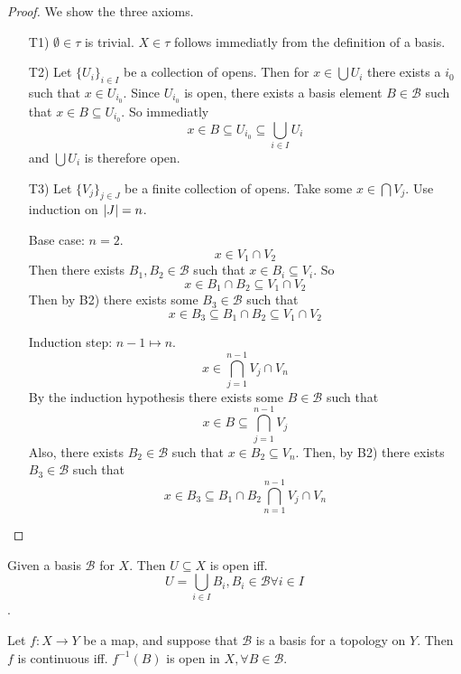 \begin{proof}
  We show the three axioms.
  \begin{enumerate}
    \item[T1)] \( \emptyset \in \tau \) is trivial. \( X \in \tau \) follows immediatly from the definition of a basis.
    \item[T2)] Let \( \{  U_i  \}_{i \in I}  \) be a collection of opens.
      Then for \( x \in \bigcup U_i \) there exists a \( i_0 \) such that
      \( x \in U_{i_0} \). Since \( U_{i_0} \) is open, there exists
      a basis element \( B \in \mathscr{B} \) such that
      \( x \in B \subseteq U_{i_0} \). So immediatly
      \[
        x \in B \subseteq U_{i_0} \subseteq \bigcup_{i \in I} U_i
      \]
      and  \( \bigcup U_i \) is therefore open.
    \item[T3)]
      Let \( \{ V_j  \}_{j \in J}  \) be a finite collection of opens.
      Take some \( x \in \bigcap V_j \). Use induction on \( \left\lvert{J}\right\rvert = n \).

      Base case: \( n = 2 \).
      \[
        x \in V_1 \cap V_2
      \]
      Then there exists \( B_1, B_2 \in \mathscr{B} \) such that
      \( x \in B_i \subseteq V_i \). So 
      \[
        x \in B_1 \cap B_2 \subseteq V_1 \cap V_2
      \]
      Then by B2) there exists some \( B_3 \in \mathscr{B} \)
      such that
      \[
        x \in B_3 \subseteq B_1 \cap B_2 \subseteq V_1 \cap V_2
      \]

      Induction step: \( n-1 \mapsto n \).
      \[
        x \in \bigcap_{j=1}^{n-1} V_j \cap V_n
      \]
      By the induction hypothesis there exists
      some \( B \in \mathscr{B} \) such that
      \[ x \in B \subseteq \bigcap_{j=1}^{n-1} V_j \]
      Also, there exists \( B_2 \in \mathscr{B} \) such that
      \( x \in B_2 \subseteq V_n \). Then, by B2) there exists
      \( B_3 \in \mathscr{B} \) such that
      \[
        x \in B_3 \subseteq B_1 \cap B_2 \bigcap_{n=1}^{n-1} V_j \cap V_n
      \]
  \end{enumerate}
\end{proof}

\begin{example}
  Given a basis \( \mathscr{B} \) for \( X \).
  Then \( U \subseteq X \) is open iff.
  \[ U = \bigcup_{i\in I} B_i, B_i \in \mathscr{B} \forall i \in I \].
\end{example}

\begin{proposition}
  Let \( f: X \to  Y \) be a map, and suppose
  that \( \mathscr{B} \) is a basis for a topology
  on \( Y \). Then \( f \) is continuous iff.
  \( {f}^{-1}(B) \) is open in \( X, \forall B \in \mathscr{B}  \).
\end{proposition}

